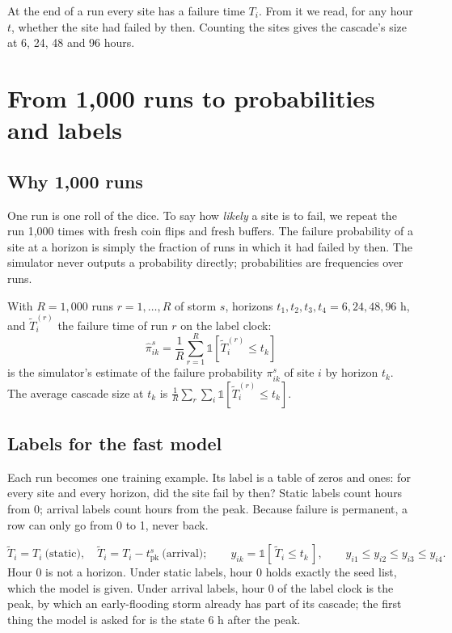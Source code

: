 \documentclass[11pt]{article}
\newcommand{\one}{\mathbb{1}}
\newcommand{\pk}{\mathrm{pk}}
\begin{document}
At the end of a run every site has a failure time $T_i$. From it we read, for any hour $t$, whether the site had failed by then. Counting the sites gives the cascade's size at 6, 24, 48 and 96 hours.

\section{From 1,000 runs to probabilities and labels}\label{sec:runs}

\subsection{Why 1,000 runs}\label{sub:why1000}

One run is one roll of the dice. To say how \emph{likely} a site is to fail, we repeat the run 1,000 times with fresh coin flips and fresh buffers. The failure probability of a site at a horizon is simply the fraction of runs in which it had failed by then. The simulator never outputs a probability directly; probabilities are frequencies over runs.

\begin{maths}
With $R=1{,}000$ runs $r=1,\dots,R$ of storm $s$, horizons $t_1,t_2,t_3,t_4 = 6, 24, 48, 96$ h, and $\tilde T_i^{(r)}$ the failure time of run $r$ on the label clock:
\[
\widehat{\pi}^s_{ik}=\frac1R\sum_{r=1}^{R}\one\!\left[\tilde T_i^{(r)}\le t_k\right]
\]
is the simulator's estimate of the failure probability $\pi^s_{ik}$ of site $i$ by horizon $t_k$. The average cascade size at $t_k$ is $\frac1R\sum_r\sum_i\one[\tilde T_i^{(r)}\le t_k]$.
\end{maths}

\subsection{Labels for the fast model}\label{sub:labels}

Each run becomes one training example. Its label is a table of zeros and ones: for every site and every horizon, did the site fail by then? Static labels count hours from 0; arrival labels count hours from the peak. Because failure is permanent, a row can only go from 0 to 1, never back.

\begin{maths}
\[
\tilde T_i = T_i\ \text{(static)},\quad \tilde T_i = T_i-t^s_{\pk}\ \text{(arrival)};\qquad y_{ik}=\one[\,\tilde T_i\le t_k\,],\qquad y_{i1}\le y_{i2}\le y_{i3}\le y_{i4}.
\]
Hour 0 is not a horizon. Under static labels, hour 0 holds exactly the seed list, which the model is given. Under arrival labels, hour 0 of the label clock is the peak, by which an early-flooding storm already has part of its cascade; the first thing the model is asked for is the state 6 h after the peak.
\end{maths}
\end{document}

